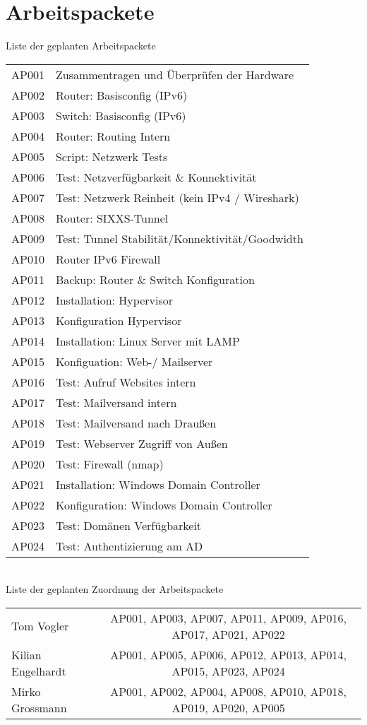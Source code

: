 \section{Arbeitspackete}

Liste der geplanten Arbeitspackete\\
\noindent \begin{tabular}{|l|l|}
\hline
AP001 & Zusammentragen und Überprüfen der Hardware \\
AP002 & Router: Basisconfig (IPv6) \\
AP003 & Switch: Basisconfig (IPv6) \\
AP004 & Router: Routing Intern \\
AP005 & Script: Netzwerk Tests \\
AP006 & Test: Netzverfügbarkeit \& Konnektivität \\
AP007 & Test: Netzwerk Reinheit (kein IPv4 / Wireshark) \\
AP008 & Router: SIXXS-Tunnel \\
AP009 & Test: Tunnel Stabilität/Konnektivität/Goodwidth \\
AP010 & Router IPv6 Firewall \\
AP011 & Backup: Router \& Switch Konfiguration \\
AP012 & Installation: Hypervisor \\
AP013 & Konfiguration Hypervisor \\
AP014 & Installation: Linux Server mit LAMP \\
AP015 & Konfiguation: Web-/ Mailserver \\
AP016 & Test: Aufruf Websites intern \\
AP017 & Test: Mailversand intern \\
AP018 & Test: Mailversand nach Draußen \\
AP019 & Test: Webserver Zugriff von Außen \\
AP020 & Test: Firewall (nmap) \\
AP021 & Installation: Windows Domain Controller \\
AP022 & Konfiguration: Windows Domain Controller \\
AP023 & Test: Domänen Verfügbarkeit \\
AP024 & Test: Authentizierung am AD \\
\hline
\end{tabular}
\vspace{0.5cm}\\
Liste der geplanten Zuordnung der Arbeitspackete\\
\noindent \begin{tabular}{|l|c|}
\hline
Tom Vogler & AP001, AP003, AP007, AP011, AP009, AP016, AP017, AP021, AP022 \\
Kilian Engelhardt & AP001, AP005, AP006, AP012, AP013, AP014, AP015, AP023, AP024 \\
Mirko Grossmann & AP001, AP002, AP004, AP008, AP010, AP018, AP019, AP020, AP005 \\
\hline
\end{tabular}
